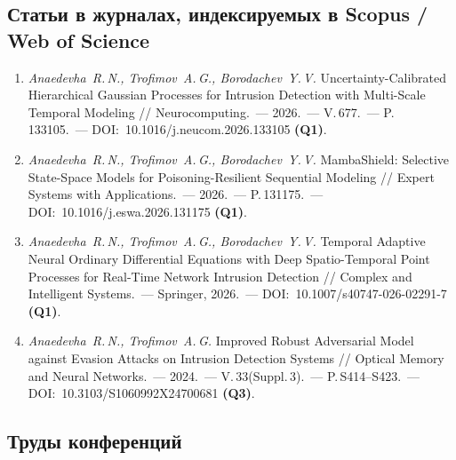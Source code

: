 \documentclass[12pt,a5paper]{article}
\begin{document}
\sloppy

\subsection*{Статьи в журналах, индексируемых в Scopus / Web of Science}

\begin{enumerate}
\item \textit{Anaedevha~R.\,N., Trofimov~A.\,G., Borodachev~Y.\,V.}
Uncertainty-Calibrated Hierarchical Gaussian Processes for
Intrusion Detection with Multi-Scale Temporal Modeling //
Neurocomputing.~--- 2026.~--- V.\,677.~--- P.\,133105.~---
DOI:~10.1016/j.neucom.2026.133105 \textbf{(Q1)}.

\item \textit{Anaedevha~R.\,N., Trofimov~A.\,G., Borodachev~Y.\,V.}
MambaShield: Selective State-Space Models for
Poisoning-Resilient Sequential Modeling // Expert Systems
with Applications.~--- 2026.~--- P.\,131175.~---
DOI:~10.1016/j.eswa.2026.131175 \textbf{(Q1)}.

\item \textit{Anaedevha~R.\,N., Trofimov~A.\,G., Borodachev~Y.\,V.}
Temporal Adaptive Neural Ordinary Differential Equations
with Deep Spatio-Temporal Point Processes for Real-Time
Network Intrusion Detection // Complex and Intelligent
Systems.~--- Springer, 2026.~---
DOI:~10.1007/s40747-026-02291-7 \textbf{(Q1)}.

\item \textit{Anaedevha~R.\,N., Trofimov~A.\,G.} Improved
Robust Adversarial Model against Evasion Attacks on
Intrusion Detection Systems // Optical Memory and Neural
Networks.~--- 2024.~--- V.\,33(Suppl.\,3).~---
P.\,S414--S423.~--- DOI:~10.3103/S1060992X24700681
\textbf{(Q3)}.

\end{enumerate}

\subsection*{Труды конференций}
\end{document}
